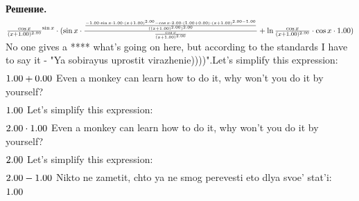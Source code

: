 \documentclass[12pt,a4paper]{extreport}
\theoremstyle{plain}
\theoremstyle{definition}
\newenvironment{solution}%
{\par\noindent\textbf{Решение. }}%
{\bigskip}
\begin{document}
\begin{solution}
\begin{gather}
\end{gather}
\begin{math}
\frac {\cos x }{(x + 1.00 )^ {2.00 }}^ {\sin x }\cdot (\sin x \cdot \frac {\frac {-1.00 \cdot \sin x \cdot 1.00 \cdot (x + 1.00 )^ {2.00 }- \cos x \cdot 2.00 \cdot (1.00 + 0.00 )\cdot (x + 1.00 )^ {2.00 - 1.00 }}{((x + 1.00 )^ {2.00 })^ {2.00 }}}{\frac {\cos x }{(x + 1.00 )^ {2.00 }}}+ \ln \frac {\cos x }{(x + 1.00 )^ {2.00 }}\cdot \cos x \cdot 1.00 )\\
\end{math}
No one gives a **** what's going on here, but according to the standards I have to say it - "Ya sobirayus uprostit virazhenie))))".Let's simplify this expression: 
\begin{gather}
\end{gather}
\begin{math}
1.00 + 0.00 \\
\end{math}
Even a monkey can learn how to do it, why won't you do it by yourself?
\begin{gather}
\end{gather}
\begin{math}
1.00 \\
\end{math}
Let's simplify this expression: 
\begin{gather}
\end{gather}
\begin{math}
2.00 \cdot 1.00 \\
\end{math}
Even a monkey can learn how to do it, why won't you do it by yourself?
\begin{gather}
\end{gather}
\begin{math}
2.00 \\
\end{math}
Let's simplify this expression: 
\begin{gather}
\end{gather}
\begin{math}
2.00 - 1.00 \\
\end{math}
Nikto ne zametit, chto ya ne smog perevesti eto dlya svoe' stat'i: 
\begin{gather}
\end{gather}
\begin{math}
1.00 \\
\end{math}

\end{solution}
\end{document}
